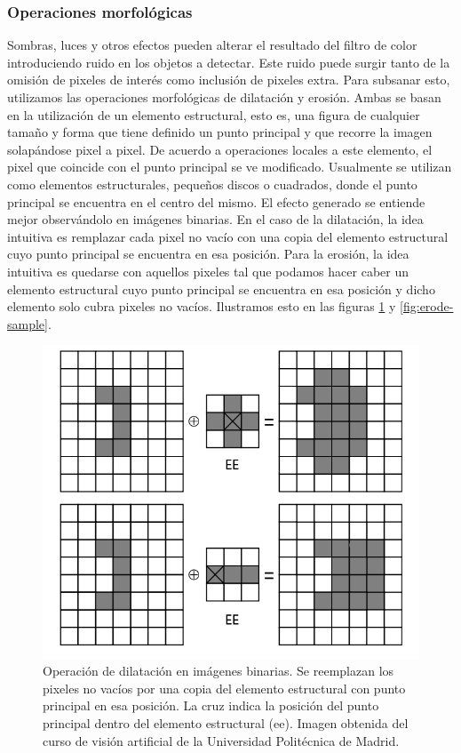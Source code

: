 	\subsubsection{\label{sec:morph} Operaciones morfol\'ogicas}
Sombras, luces y otros efectos pueden alterar el resultado del filtro 
de color introduciendo ruido en los objetos a detectar. Este ruido 
puede surgir tanto de la omisi\'on de pixeles de inter\'es como  inclusi\'on de pixeles extra. Para subsanar esto, utilizamos las operaciones morfol\'ogicas de dilataci\'on y erosi\'on. Ambas se basan en la utilizaci\'on de un elemento estructural, esto es, una figura de cualquier tama\~no y forma que tiene definido un punto principal y que recorre la imagen solap\'andose pixel a pixel. De acuerdo a operaciones locales a este elemento, el pixel que coincide con el punto principal se ve modificado. Usualmente se utilizan como elementos estructurales, peque\~nos discos o cuadrados, donde el punto principal se encuentra en el centro del mismo. El efecto generado se entiende mejor observ\'andolo en im\'agenes binarias. En el caso de la dilataci\'on, la idea intuitiva es remplazar cada pixel no vac\'io con una copia del elemento estructural cuyo punto principal se encuentra en esa posici\'on. Para la erosi\'on, la idea intuitiva es quedarse con aquellos pixeles tal que podamos hacer caber un elemento estructural cuyo punto principal se encuentra en esa posici\'on y dicho elemento solo cubra pixeles no vac\'ios.
Ilustramos esto en las figuras \ref{fig:dilate-sample} y \ref{fig:erode-sample}.


\begin{figure}[tpb]
\begin{center}
  \includegraphics[scale=0.4]{vision/figures/dilate-sample.png}
\end{center}
  \caption[Operaci\'on de dilataci\'on]{\small Operaci\'on de dilataci\'on en im\'agenes binarias. Se reemplazan los pixeles no vac\'ios por una copia del elemento estructural con punto principal en esa posici\'on. La cruz indica la posici\'on del punto principal dentro del elemento estructural (ee). Imagen obtenida del curso de visi\'on artificial de la Universidad Polit\'ecnica de Madrid.}
  \label{fig:dilate-sample}
\end{figure}

